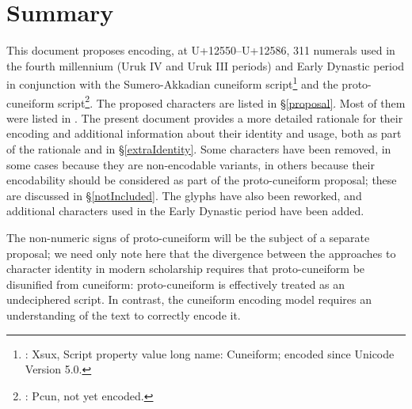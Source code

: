 \documentclass[10pt, a4paper, twoside]{article}
\title{\thisDocumentTitle}
\author{Robin Leroy, Anshuman Pandey, and Steve Tinney}
\newcommand{\thisDocumentNumber}{L2/24-210}
\begin{document}
\maketitle
{}

\tableofcontents

\section{Summary}

This document proposes encoding, at U+12550--U+12586, 311 numerals
used in the fourth millennium (Uruk IV and Uruk III periods) and Early Dynastic period in conjunction
with the Sumero-Akkadian cuneiform script\footnote{\cite{ISO15924}: Xsux, Script property value long name: Cuneiform; encoded since Unicode Version 5.0.}
and the proto-cuneiform script\footnote{\cite{ISO15924}: Pcun, not yet encoded.}.
The proposed characters are listed in §\ref{proposal}.
Most of them were listed in \cite{L2/23-190}.
The present document provides a more detailed rationale for their encoding
and additional information about their identity and usage,
both as part of the rationale and in §\ref{extraIdentity}. Some characters have been
removed, in some cases because they are non-encodable variants,
in others because their encodability should be considered as part of the proto-cuneiform proposal;
these are discussed in §\ref{notIncluded}.
The glyphs have also been reworked, and
additional characters used in the Early Dynastic period have been added.

The non-numeric signs of proto-cuneiform will be the subject of a separate proposal;
we need only note here that the divergence between the approaches to character identity
in modern scholarship requires that proto-cuneiform be disunified from cuneiform:
proto-cuneiform is effectively treated as an undeciphered script.
In contrast, the cuneiform encoding model requires an understanding of the text to correctly encode it.
\end{document}
